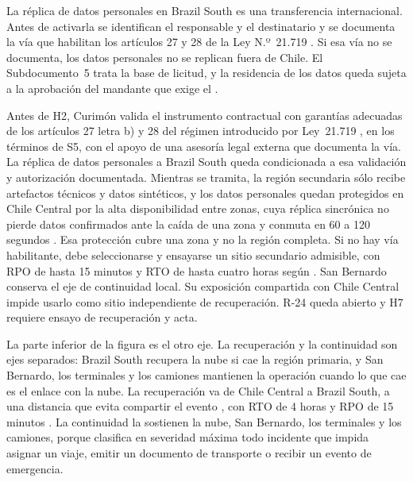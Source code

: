 La réplica de datos personales en Brazil South es una transferencia internacional. Antes de activarla
se identifican el responsable y el destinatario y se documenta la vía que habilitan los artículos 27 y
28 de la Ley N.º~21.719 \parencite{ley21719}. Si esa vía no se documenta, los datos personales no se
replican fuera de Chile. El Subdocumento~5 trata la base de licitud, y la residencia de los datos queda
sujeta a la aprobación del mandante que exige el .

Antes de H2, Curimón valida el instrumento contractual con garantías adecuadas de los artículos 27 letra b) y 28 del régimen introducido por Ley~21.719 \parencite{d3_ley21719}, en los términos de S5, con el apoyo de una asesoría legal externa que documenta la vía. La réplica de datos personales a Brazil South queda condicionada a esa validación y autorización documentada. Mientras se tramita, la región secundaria sólo recibe artefactos técnicos y datos sintéticos, y los datos personales quedan protegidos en Chile Central por la alta disponibilidad entre zonas, cuya réplica sincrónica no pierde datos confirmados ante la caída de una zona y conmuta en 60 a 120 segundos \parencite{ms_pg_confiabilidad}. Esa protección cubre una zona y no la región completa. Si no hay vía habilitante, debe seleccionarse y ensayarse un sitio secundario admisible, con RPO de hasta 15 minutos y RTO de hasta cuatro horas según . San Bernardo conserva el eje de continuidad local. Su exposición compartida con Chile Central impide usarlo como sitio independiente de recuperación. R-24 queda abierto y H7 requiere ensayo de recuperación y acta.

La parte inferior de la figura es el otro eje. La recuperación y la continuidad son ejes separados:
Brazil South recupera la nube si cae la región primaria, y San Bernardo, los terminales y los camiones
mantienen la operación cuando lo que cae es el enlace con la nube. La recuperación va de Chile Central a Brazil South, a una distancia que evita
compartir el evento , con RTO de 4 horas y RPO de 15 minutos
. La continuidad la sostienen la nube, San Bernardo, los terminales y los
camiones, porque  clasifica en severidad máxima todo incidente que impida asignar un
viaje, emitir un documento de transporte o recibir un evento de emergencia.

